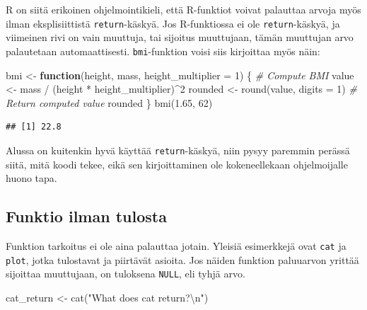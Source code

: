 \documentclass[
]{book}
\newenvironment{Shaded}{\begin{snugshade}}{\end{snugshade}}
\newcommand{\AttributeTok}[1]{\textcolor[rgb]{0.77,0.63,0.00}{#1}}
\newcommand{\CommentTok}[1]{\textcolor[rgb]{0.56,0.35,0.01}{\textit{#1}}}
\newcommand{\ControlFlowTok}[1]{\textcolor[rgb]{0.13,0.29,0.53}{\textbf{#1}}}
\newcommand{\DecValTok}[1]{\textcolor[rgb]{0.00,0.00,0.81}{#1}}
\newcommand{\FloatTok}[1]{\textcolor[rgb]{0.00,0.00,0.81}{#1}}
\newcommand{\FunctionTok}[1]{\textcolor[rgb]{0.00,0.00,0.00}{#1}}
\newcommand{\NormalTok}[1]{#1}
\newcommand{\OtherTok}[1]{\textcolor[rgb]{0.56,0.35,0.01}{#1}}
\newcommand{\SpecialCharTok}[1]{\textcolor[rgb]{0.00,0.00,0.00}{#1}}
\newcommand{\StringTok}[1]{\textcolor[rgb]{0.31,0.60,0.02}{#1}}
\begin{document}
R on siitä erikoinen ohjelmointikieli, että R-funktiot voivat palauttaa arvoja myös ilman eksplisiittistä \texttt{return}-käskyä. Jos R-funktiossa ei ole \texttt{return}-käskyä, ja viimeinen rivi on vain muuttuja, tai sijoitus muuttujaan, tämän muuttujan arvo palautetaan automaattisesti. \texttt{bmi}-funktion voisi siis kirjoittaa myös näin:

\begin{Shaded}
\begin{Highlighting}[]
\NormalTok{bmi }\OtherTok{\textless{}{-}} \ControlFlowTok{function}\NormalTok{(height, mass, }\AttributeTok{height\_multiplier =} \DecValTok{1}\NormalTok{) \{}
  \CommentTok{\# Compute BMI}
\NormalTok{  value }\OtherTok{\textless{}{-}}\NormalTok{ mass }\SpecialCharTok{/}\NormalTok{ (height }\SpecialCharTok{*}\NormalTok{ height\_multiplier)}\SpecialCharTok{\^{}}\DecValTok{2}
\NormalTok{  rounded }\OtherTok{\textless{}{-}} \FunctionTok{round}\NormalTok{(value, }\AttributeTok{digits =} \DecValTok{1}\NormalTok{)}
  \CommentTok{\# Return computed value}
\NormalTok{  rounded}
\NormalTok{\}}
\FunctionTok{bmi}\NormalTok{(}\FloatTok{1.65}\NormalTok{, }\DecValTok{62}\NormalTok{)}
\end{Highlighting}
\end{Shaded}

\begin{verbatim}
## [1] 22.8
\end{verbatim}

Alussa on kuitenkin hyvä käyttää \texttt{return}-käskyä, niin pysyy paremmin perässä siitä, mitä koodi tekee, eikä sen kirjoittaminen ole kokeneellekaan ohjelmoijalle huono tapa.

\hypertarget{funktio-ilman-tulosta}{%
\subsection{Funktio ilman tulosta}\label{funktio-ilman-tulosta}}

Funktion tarkoitus ei ole aina palauttaa jotain. Yleisiä esimerkkejä ovat \texttt{cat} ja \texttt{plot}, jotka tulostavat ja piirtävät asioita. Jos näiden funktion paluuarvon yrittää sijoittaa muuttujaan, on tuloksena \texttt{NULL}, eli tyhjä arvo.

\begin{Shaded}
\begin{Highlighting}[]
\NormalTok{cat\_return }\OtherTok{\textless{}{-}} \FunctionTok{cat}\NormalTok{(}\StringTok{"What does cat return?}\SpecialCharTok{\textbackslash{}n}\StringTok{"}\NormalTok{)}
\end{Highlighting}
\end{Shaded}
\end{document}

